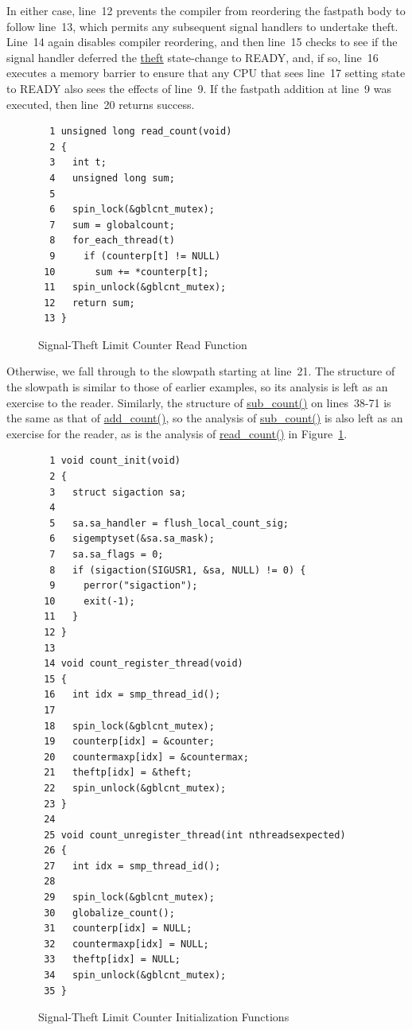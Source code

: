 In either case, line~12 prevents the compiler from reordering the
fastpath body to follow line~13, which permits any subsequent signal
handlers to undertake theft.
Line~14 again disables compiler reordering, and then line~15
checks to see if the signal handler deferred the \url{theft}
state-change to READY, and, if so, line~16 executes a memory
barrier to ensure that any CPU that sees line~17 setting state to
READY also sees the effects of line~9.
If the fastpath addition at line~9 was executed, then line~20 returns
success.

\begin{figure}[tbp]
{ \scriptsize
\begin{verbatim}
  1 unsigned long read_count(void)
  2 {
  3   int t;
  4   unsigned long sum;
  5 
  6   spin_lock(&gblcnt_mutex);
  7   sum = globalcount;
  8   for_each_thread(t)
  9     if (counterp[t] != NULL)
 10       sum += *counterp[t];
 11   spin_unlock(&gblcnt_mutex);
 12   return sum;
 13 }
\end{verbatim}
}
\caption{Signal-Theft Limit Counter Read Function}
\label{fig:count:Signal-Theft Limit Counter Read Function}
\end{figure}

Otherwise, we fall through to the slowpath starting at line~21.
The structure of the slowpath is similar to those of earlier examples,
so its analysis is left as an exercise to the reader.
Similarly, the structure of \url{sub_count()} on lines~38-71 is the same
as that of \url{add_count()}, so the analysis of \url{sub_count()} is also
left as an exercise for the reader, as is the analysis of
\url{read_count()} in
Figure~\ref{fig:count:Signal-Theft Limit Counter Read Function}.

\begin{figure}[tbp]
{ \scriptsize
\begin{verbatim}
  1 void count_init(void)
  2 {
  3   struct sigaction sa;
  4 
  5   sa.sa_handler = flush_local_count_sig;
  6   sigemptyset(&sa.sa_mask);
  7   sa.sa_flags = 0;
  8   if (sigaction(SIGUSR1, &sa, NULL) != 0) {
  9     perror("sigaction");
 10     exit(-1);
 11   }
 12 }
 13 
 14 void count_register_thread(void)
 15 {
 16   int idx = smp_thread_id();
 17 
 18   spin_lock(&gblcnt_mutex);
 19   counterp[idx] = &counter;
 20   countermaxp[idx] = &countermax;
 21   theftp[idx] = &theft;
 22   spin_unlock(&gblcnt_mutex);
 23 }
 24 
 25 void count_unregister_thread(int nthreadsexpected)
 26 {
 27   int idx = smp_thread_id();
 28 
 29   spin_lock(&gblcnt_mutex);
 30   globalize_count();
 31   counterp[idx] = NULL;
 32   countermaxp[idx] = NULL;
 33   theftp[idx] = NULL;
 34   spin_unlock(&gblcnt_mutex);
 35 }
\end{verbatim}
}
\caption{Signal-Theft Limit Counter Initialization Functions}
\label{fig:count:Signal-Theft Limit Counter Initialization Functions}
\end{figure}


